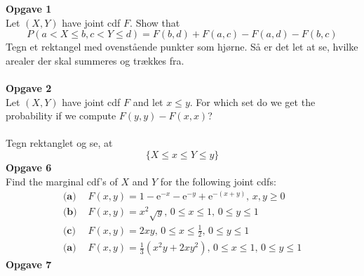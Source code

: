 \documentclass[12pt,a4paper,draft]{report}
\author{Frederik Appel Vardinghus-Nielsen}
\begin{document}
\noindent\textbf{Opgave 1}\\
Let $(X,Y)$ have joint cdf $F$. Show that
\begin{equation}
P(a<X\leq b,c<Y\leq d)=F(b,d)+F(a,c)-F(a,d)-F(b,c)
\end{equation}
Tegn et rektangel med ovenstående punkter som hjørne. Så er det let at se, hvilke arealer der skal summeres og trækkes fra.\\\\
\textbf{Opgave 2}\\
Let $(X,Y)$ have joint cdf $F$ and let $x\leq y$. For which set do we get the probability if we compute $F(y,y)-F(x,x)$?\\\\
Tegn rektanglet og se, at
\begin{equation}
\{X\leq x\leq Y\leq y\}
\end{equation}
\textbf{Opgave 6}\\
Find the marginal cdf's of $X$ and $Y$ for the following joint cdfs:
\begin{align*}
\textbf{(a) }&F(x,y)=1-\mathrm{e}^{-x}-\mathrm{e}^{-y}+\mathrm{e}^{-(x+y)},\,x,y\geq0\\
\textbf{(b) }&F(x,y)=x^2\sqrt{y},\,0\leq x\leq 1,\, 0\leq y\leq 1\\
\textbf{(c) }&F(x,y)=2xy,\, 0\leq x\leq \frac{1}{2},\,0\leq y\leq 1\\
\textbf{(a) }&F(x,y)=\frac{1}{3}(x^2y+2xy^2),\,0\leq x\leq1,\,0\leq y\leq 1
\end{align*}
\textbf{Opgave 7}\\
\end{document}

